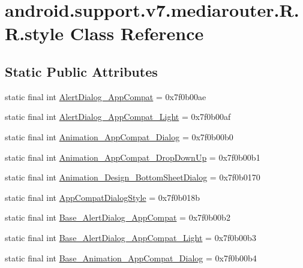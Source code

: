 \hypertarget{classandroid_1_1support_1_1v7_1_1mediarouter_1_1_r_1_1style}{
\section{android.support.v7.mediarouter.R.R.style Class Reference}
\label{classandroid_1_1support_1_1v7_1_1mediarouter_1_1_r_1_1style}
}
\subsection*{Static Public Attributes}
\begin{CompactItemize}
\item 
static final int \hyperlink{classandroid_1_1support_1_1v7_1_1mediarouter_1_1_r_1_1style_3b8061b736bc67d1f9dfd883b52ed477}{AlertDialog\_\-AppCompat} = 0x7f0b00ae
\item 
static final int \hyperlink{classandroid_1_1support_1_1v7_1_1mediarouter_1_1_r_1_1style_65a34c04d9c5fd27984e27fe1566d8a2}{AlertDialog\_\-AppCompat\_\-Light} = 0x7f0b00af
\item 
static final int \hyperlink{classandroid_1_1support_1_1v7_1_1mediarouter_1_1_r_1_1style_07ca08ee6e92951d8d7fe80aa46e965f}{Animation\_\-AppCompat\_\-Dialog} = 0x7f0b00b0
\item 
static final int \hyperlink{classandroid_1_1support_1_1v7_1_1mediarouter_1_1_r_1_1style_0a6ab441d52a2c72bfe0f759563cf108}{Animation\_\-AppCompat\_\-DropDownUp} = 0x7f0b00b1
\item 
static final int \hyperlink{classandroid_1_1support_1_1v7_1_1mediarouter_1_1_r_1_1style_bf767aa467924db531baf0b9adb121f0}{Animation\_\-Design\_\-BottomSheetDialog} = 0x7f0b0170
\item 
static final int \hyperlink{classandroid_1_1support_1_1v7_1_1mediarouter_1_1_r_1_1style_52602e95687662cfbc03d127b0fcb61a}{AppCompatDialogStyle} = 0x7f0b018b
\item 
static final int \hyperlink{classandroid_1_1support_1_1v7_1_1mediarouter_1_1_r_1_1style_9432c95e3c38ddc2a16a8da086e691e2}{Base\_\-AlertDialog\_\-AppCompat} = 0x7f0b00b2
\item 
static final int \hyperlink{classandroid_1_1support_1_1v7_1_1mediarouter_1_1_r_1_1style_0aeef78846905461d5de842c3af0d7de}{Base\_\-AlertDialog\_\-AppCompat\_\-Light} = 0x7f0b00b3
\item 
static final int \hyperlink{classandroid_1_1support_1_1v7_1_1mediarouter_1_1_r_1_1style_3e9c4c89ed5a10fb2963a54020b3d90e}{Base\_\-Animation\_\-AppCompat\_\-Dialog} = 0x7f0b00b4

\end{CompactItemize}
